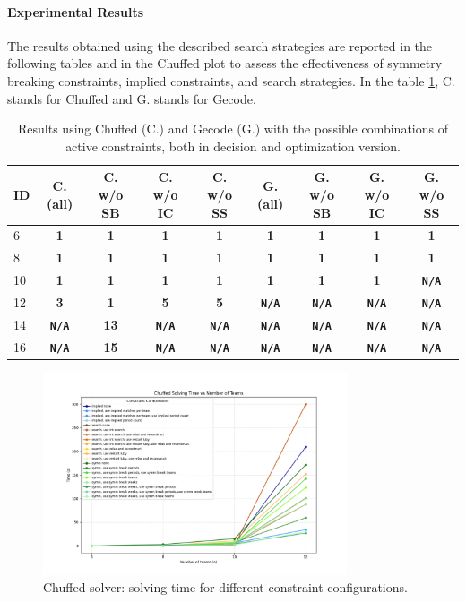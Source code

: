 \documentclass[11pt]{article}
\begin{document}
\paragraph{Experimental Results}

The results obtained using the described search strategies are reported in the following tables and in the Chuffed plot to assess the effectiveness of symmetry breaking constraints, implied constraints, and search strategies. In the table \ref{tab:cp}, C. stands for Chuffed and G. stands for Gecode.

\begin{table}[H]
\small
\begin{tabular}{@{}lcccccccc@{}}
\toprule
ID & C. (all) & C. w/o SB & C. w/o IC & C. w/o SS & G. (all) & G. w/o SB & G. w/o IC & G. w/o SS \\
\midrule
6 & \textbf{1} & \textbf{1} & \textbf{1} & \textbf{1} & \textbf{1} & \textbf{1} & \textbf{1} & \textbf{1}\\
8 & \textbf{1} & \textbf{1} & \textbf{1} & \textbf{1} & \textbf{1} & \textbf{1} & \textbf{1} & \textbf{1}\\
10 & \textbf{1} & \textbf{1} & \textbf{1} & \textbf{1} & \textbf{1} & \textbf{1} & \textbf{1} & \textbf{\texttt{N/A}}\\
12 & \textbf{3} & \textbf{1} & \textbf{5} & \textbf{5} & \textbf{\texttt{N/A}} & \textbf{\texttt{N/A}} & \textbf{\texttt{N/A}} & \textbf{\texttt{N/A}}\\
14 & \textbf{\texttt{N/A}} & \textbf{13} & \textbf{\texttt{N/A}} & \textbf{\texttt{N/A}} & \textbf{\texttt{N/A}} & \textbf{\texttt{N/A}} & \textbf{\texttt{N/A}} & \textbf{\texttt{N/A}}\\
16 & \textbf{\texttt{N/A}} & \textbf{15} & \textbf{\texttt{N/A}} & \textbf{\texttt{N/A}} & \textbf{\texttt{N/A}} & \textbf{\texttt{N/A}} & \textbf{\texttt{N/A}} & \textbf{\texttt{N/A}}\\
\bottomrule
\end{tabular}
\caption{Results using Chuffed (C.) and Gecode (G.) with the possible combinations of active constraints, both in decision and optimization version.}
\label{tab:cp}
\end{table}

\begin{figure}[H]
    \centering
    \includegraphics[width=0.8\textwidth]{chuffed_plot.png}
    \caption{Chuffed solver: solving time for different constraint configurations.}
    \label{fig:chuffed_plot}
\end{figure}
\end{document}
